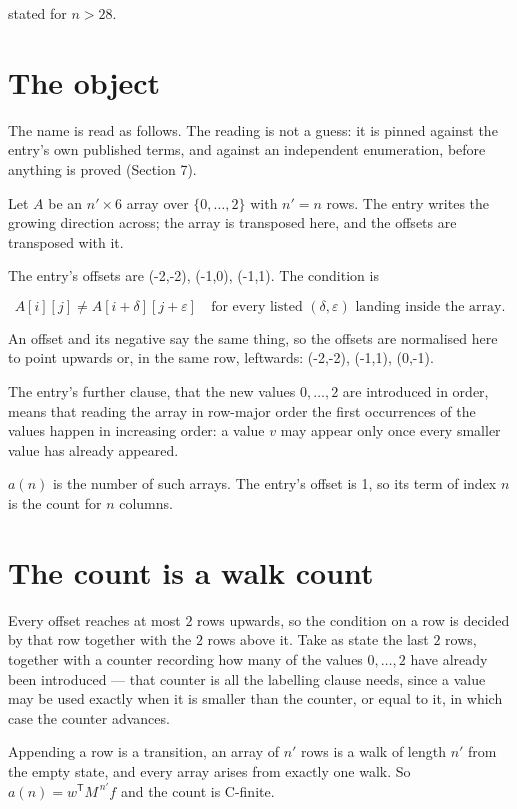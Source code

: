 \documentclass[11pt]{article}
\theoremstyle{definition}
\begin{document}
stated for $n > 28$.

\section{The object}

The name is read as follows. The reading is not a guess: it is pinned against the entry's own published terms, and against an independent enumeration, before anything is proved (Section 7).

Let $A$ be an $n' \times 6$ array over $\{0,\dots,2\}$ with $n' = n$ rows. The entry writes the growing direction across; the array is transposed here, and the offsets are transposed with it.

The entry's offsets are (-2,-2), (-1,0), (-1,1). The condition is

\[A[i][j] \ne A[i{+}\delta][j{+}\varepsilon]\quad\text{for every listed }(\delta,\varepsilon)\text{ landing inside the array.}\]

An offset and its negative say the same thing, so the offsets are normalised here to point upwards or, in the same row, leftwards: (-2,-2), (-1,1), (0,-1).

The entry's further clause, that the new values $0,\dots,2$ are introduced in order, means that reading the array in row-major order the first occurrences of the values happen in increasing order: a value $v$ may appear only once every smaller value has already appeared.

$a(n)$ is the number of such arrays. The entry's offset is 1, so its term of index $n$ is the count for $n$ columns.

\section{The count is a walk count}

Every offset reaches at most $2$ rows upwards, so the condition on a row is decided by that row together with the $2$ rows above it. Take as state the last $2$ rows, together with a counter recording how many of the values $0,\dots,2$ have already been introduced --- that counter is all the labelling clause needs, since a value may be used exactly when it is smaller than the counter, or equal to it, in which case the counter advances.

Appending a row is a transition, an array of $n'$ rows is a walk of length $n'$ from the empty state, and every array arises from exactly one walk. So $a(n) = w^{\mathsf T}M^{\,n'}f$ and the count is C-finite.
\end{document}
